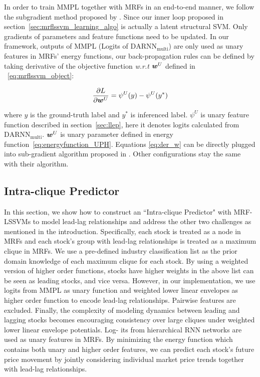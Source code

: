 In order to train MMPL together with MRFs in an end-to-end
manner, we follow the subgradient method proposed by
. Since our inner loop
proposed in section~\ref{sec:mrflssvm_learning_algo} is actually
a latent structural SVM. Only gradients of parameters and feature
functions need to be updated. In our framework, outputs of
MMPL (Logits of $\text{DARNN}_{\text{multi}}$) are only used as unary features in MRFs' energy functions,
our back-propagation rules can be defined by taking derivative of the objective function \textit{w.r.t} ${\bm{w}}^U$  defined in
~\eqref{eq:mrflssvm_object}:

\begin{align}
  \label{eq:der_w}
  \frac{\partial L}{\partial {\bm{w}}^U} = \psi^U(y)-\psi^U(y^*)
\end{align}

\noindent where $y$ is the ground-truth label and $y^*$ is
inferenced label. $\psi^U$ is unary feature
function described in section~\ref{sec:llep}, here it denotes
logits calculated from $\text{DARNN}_{\text{multi}}$. ${\bm{w}}^U$ is
unary parameter defined in energy function~\eqref{eq:energyfunction_UPH}.
Equations \eqref{eq:der_w} can be directly plugged
into sub-gradient algorithm proposed in \cite{witoonchart2017application}.
Other configurations stay the same with their algorithm.

\subsection{Intra-clique Predictor}
\label{sec:srp}

In this section, we show how to construct an ``Intra-clique
Predictor" with MRF-LSSVMs to model lead-lag relationships and
address the other two challenges as mentioned in the
introduction. Specifically, each stock is treated as a node in
MRFs and each stock's group with lead-lag relationships is
treated as a maximum clique in MRFs. We use a pre-defined
industry classification list \cite{ths} as the prior domain
knowledge of each maximum clique for each stock. By using a
weighted version of higher order functions, stocks have higher
weights in the above list can be seen as leading stocks, and vice
versa. However, in our implementation, we use logits from MMPL as
unary function and weighted lower linear envelopes as higher
order function to encode lead-lag relationships. Pairwise
features are excluded. Finally, the complexity of modeling
dynamics between leading and lagging stocks becomes encouraging
consistency over large cliques under weighted lower linear
envelope potentials. Log- its from hierarchical RNN networks are
used as unary features in MRFs. By minimizing the energy function
which contains both unary and higher order features, we can
predict each stock's future price movement by jointly considering
individual market price trends together with lead-lag
relationships.


